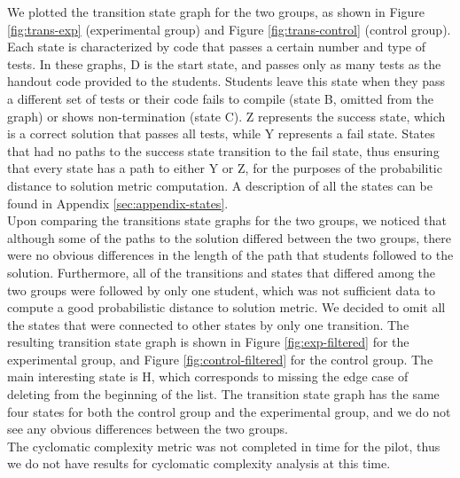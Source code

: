 \documentclass[11pt,letterpaper]{article}
\begin{document}
We plotted the transition state graph for the two groups, as shown in Figure \ref{fig:trans-exp} (experimental group) and Figure \ref{fig:trans-control} (control group). Each state is characterized by code that passes a certain number and type of tests. In these graphs, D is the start state, and passes only as many tests as the handout code provided to the students. Students leave this state when they pass a different set of tests or their code fails to compile (state B, omitted from the graph) or shows non-termination (state C). Z represents the success state, which is a correct solution that passes all tests, while Y represents a fail state.  States that had no paths to the success state transition to the fail state, thus ensuring that every state has a path to either Y or Z, for the purposes of the probabilitic distance to solution metric computation. A description of all the states can be found in Appendix \ref{sec:appendix-states}.\\

Upon comparing the transitions state graphs for the two groups, we noticed that although some of the paths to the solution differed between the two groups, there were no obvious differences in the length of the path that students followed to the solution. Furthermore, all of the transitions and states that differed among the two groups were followed by only one student, which was not sufficient data to compute a good probabilistic distance to solution metric. We decided to omit all the states that were connected to other states by only one transition. The resulting transition state graph is shown in Figure \ref{fig:exp-filtered} for the experimental group, and Figure \ref{fig:control-filtered} for the control group. The main interesting state is H, which corresponds to missing the edge case of deleting from the beginning of the list. The transition state graph has the same four states for both the control group and the experimental group, and we do not see any obvious differences between the two groups.\\

The cyclomatic complexity metric was not completed in time for the pilot, thus we do not have results for cyclomatic complexity analysis at this time.
\end{document}
